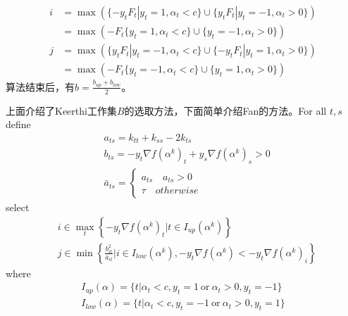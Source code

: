             \begin{align*}
            i &= \max \left( \{-y_tF_t|y_t=1,\alpha_t <c\}\cup \{y_tF_t|y_t=-1,\alpha_t>0\} \right) \\
            &=\max \left( -F_t\{y_t=1,\alpha_t <c\}\cup \{y_t=-1,\alpha_t>0\} \right) \\
            j &= \max \left( \{y_tF_t|y_t=-1,\alpha_t <c\}\cup \{-y_tF_t|y_t=1,\alpha_t>0\} \right) \\
            &=\max \left( -F_t\{y_t=-1,\alpha_t <c\}\cup \{y_t=1,\alpha_t>0\} \right)
            \end{align*}
            算法结束后，有$b = \frac{b_{up}+b_{low}}{2}$。
            \par
            上面介绍了Keerthi工作集$B$的选取方法，下面简单介绍Fan的方法。For all $t,s$ define
            \begin{align*}
            &a_{ts} = k_{tt} +k_{ss}-2k_{ts}\\
            &b_{ts} = -y_t\nabla f(\alpha^k)_t+y_s\nabla f(\alpha^k)_s>0\\
            &\bar{a}_{ts} = \left\{
            \begin{aligned}
            a_{ts}\quad a_{ts}>0\\
            \tau \quad otherwise
            \end{aligned}
            \right.
            \end{align*}
            select
            \begin{align*}
            & i\in \max_t \left\{ -y_t\nabla f(\alpha^k)_t|t\in I_{up}(\alpha^k) \right\}\\
            & j\in \min \left\{\frac{b_{it}^2}{\bar{a}_{it}}|i\in I_{low}(\alpha^k),-y_t\nabla f(\alpha^k)<-y_t\nabla f(\alpha^k)_i  \right\}
            \end{align*}
            where
            \begin{align*}
            I_{up}(\alpha) = \{t|\alpha_t <c,y_t=1\ \mathrm{or}\ \alpha_t>0,y_t=-1\}\\
            I_{low}(\alpha) = \{t|\alpha_t <c,y_t=-1\ \mathrm{or}\ \alpha_t>0,y_t=1\}
            \end{align*}


